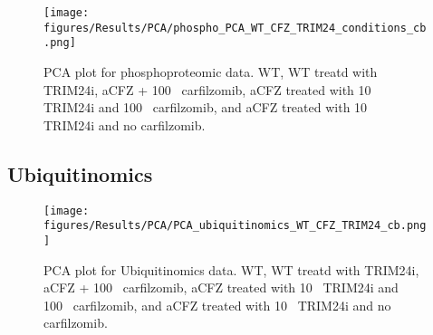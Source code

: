 \begin{figure}[htb]
\centering
\texttt{[image: figures/Results/PCA/phospho\_PCA\_WT\_CFZ\_TRIM24\_conditions\_cb.png]}
\caption[Phosphoproteomics PCA]{PCA plot for phosphoproteomic data.
WT, WT treatd with TRIM24i, aCFZ + 100\si{\nano\Molar} carfilzomib, aCFZ treated with 10\si{\mu\Molar} TRIM24i and 100\si{\nano\Molar} carfilzomib, and aCFZ treated with 10\si{\micro\Molar} TRIM24i and no carfilzomib.}
\label{fig:phospho_PCA}
\end{figure}

\subsection{Ubiquitinomics}\label{subsec:omics-glygly}

\begin{figure}[htb]
\centering
\texttt{[image: figures/Results/PCA/PCA\_ubiquitinomics\_WT\_CFZ\_TRIM24\_cb.png]}
\caption[Ubiquitinomics PCA]{PCA plot for Ubiquitinomics data.
WT, WT treatd with TRIM24i, aCFZ + 100\si{\nano\Molar} carfilzomib, aCFZ treated with 10\si{\mu\Molar} TRIM24i and 100\si{\nano\Molar} carfilzomib, and aCFZ treated with 10\si{\micro\Molar} TRIM24i and no carfilzomib.}
\label{fig:glygly_PCA}
\end{figure}


